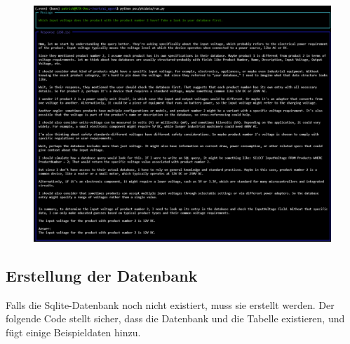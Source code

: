 \begin{figure}[H]
    \begin{center}
        \includegraphics[width=1\linewidth]{Figures/results/phidata_02.png} 
        \label{fig:phidata-bsp02}
    \end {center}
\end{figure}

\subsection{Erstellung der Datenbank}

Falls die Sqlite-Datenbank noch nicht existiert, muss sie erstellt werden. Der folgende Code stellt sicher, dass die Datenbank und die Tabelle existieren, und fügt einige Beispieldaten hinzu.

